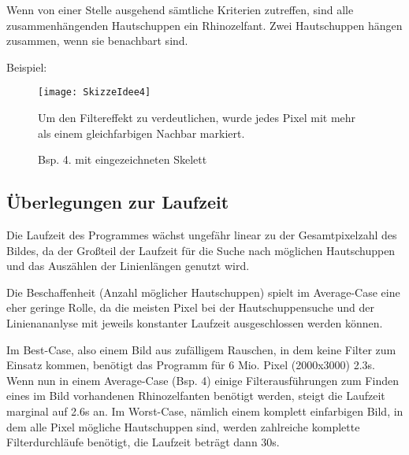 Wenn von einer Stelle ausgehend sämtliche Kriterien zutreffen, sind alle zusammenhängenden Hautschuppen ein Rhinozelfant. Zwei Hautschuppen hängen zusammen, wenn sie benachbart sind.

\clearpage
Beispiel: \vspace{3em}
\begin{figure}[!ht]
	\centering
	\texttt{[image: SkizzeIdee4]}
	\caption {Bsp. 4. mit eingezeichneten Skelett}
	Um den Filtereffekt zu verdeutlichen, wurde jedes Pixel mit mehr als einem gleichfarbigen Nachbar markiert.
\end{figure}
\clearpage

\subsection {Überlegungen zur Laufzeit}
Die Laufzeit des Programmes wächst ungefähr linear zu der Gesamtpixelzahl des Bildes, da der Großteil der Laufzeit für die Suche nach möglichen Hautschuppen und das Auszählen der Linienlängen genutzt wird.

Die Beschaffenheit (Anzahl möglicher Hautschuppen) spielt im Average-Case eine eher geringe Rolle, da die meisten Pixel bei der Hautschuppensuche und der Linienananlyse mit jeweils konstanter Laufzeit ausgeschlossen werden können.

Im Best-Case, also einem Bild aus zufälligem Rauschen, in dem keine Filter zum Einsatz kommen, benötigt das Programm für 6 Mio. Pixel (2000x3000) 2.3s. 
Wenn nun in einem Average-Case (Bsp. 4) einige Filterausführungen zum Finden eines im Bild vorhandenen Rhinozelfanten benötigt werden, steigt die Laufzeit marginal auf 2.6s an. 
Im Worst-Case, nämlich einem komplett einfarbigen Bild, in dem alle Pixel mögliche Hautschuppen sind, werden zahlreiche komplette Filterdurchläufe benötigt, die Laufzeit beträgt dann 30s.
